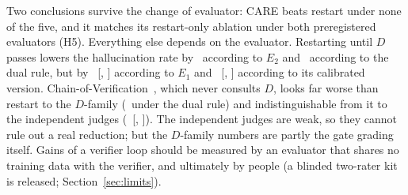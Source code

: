 \begin{table}[t]\centering\small
\caption{Hallucination rate (\%) on the held-out half of RAGTruth under five evaluators. $D$-family
evaluators share LettuceDetect's training data with the gate. Differences from restart with 95\%
CIs: \texttt{results/recovery/final/evaluator\_robustness.md}.}
\label{tab:evaluators}
\setlength{\tabcolsep}{2.5pt}
\end{table}

Two conclusions survive the change of evaluator: CARE beats restart under none of the five, and
it matches its restart-only ablation under both preregistered evaluators (H5). Everything else depends on the evaluator. Restarting until $D$ passes
lowers the hallucination rate by \robBaseETwoDiff\ according to $E_2$ and \robBaseDualDiff\ according to
the dual rule, but by \robBaseEOneDiff\ [\robBaseEOneDiffLo, \robBaseEOneDiffHi] according to $E_1$ and
\robBaseEOneCalDiff\ [\robBaseEOneCalDiffLo, \robBaseEOneCalDiffHi] according to its calibrated
version. Chain-of-Verification~\cite{dhuliawala2024cove}, which never consults $D$, looks far worse
than restart to the $D$-family (\robCoveDualDiff\ under the dual rule) and indistinguishable from it
to the independent judges (\robCoveEOneDiff\ [\robCoveEOneDiffLo, \robCoveEOneDiffHi]). The independent
judges are weak, so they cannot rule out a real reduction; but the $D$-family numbers are partly
the gate grading itself. Gains of a verifier loop should be measured by an evaluator that shares
no training data with the verifier, and ultimately by people (a blinded two-rater kit is
released; Section~\ref{sec:limits}).


